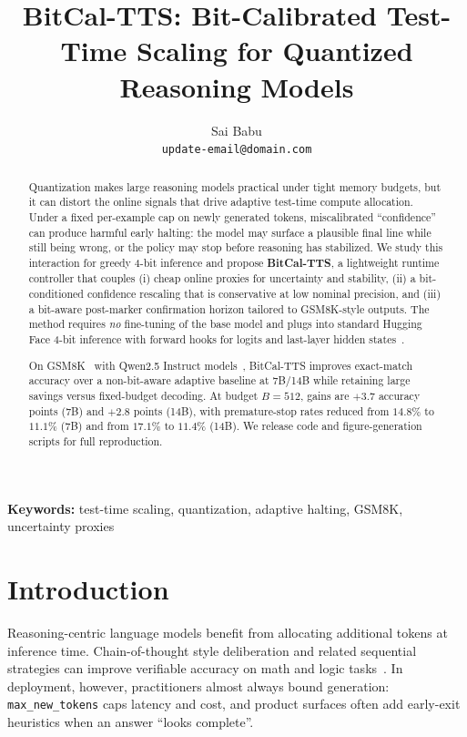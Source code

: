 \documentclass[11pt]{article}
\title{BitCal-TTS: Bit-Calibrated Test-Time Scaling for Quantized Reasoning Models}
\author{
  Sai Babu\\
  \texttt{update-email@domain.com}
}
\date{}
\begin{document}
\maketitle

\begin{abstract}
Quantization makes large reasoning models practical under tight memory budgets, but it can distort the online signals that drive adaptive test-time compute allocation. Under a fixed per-example cap on newly generated tokens, miscalibrated ``confidence'' can produce harmful early halting: the model may surface a plausible final line while still being wrong, or the policy may stop before reasoning has stabilized. We study this interaction for greedy 4-bit inference and propose \textbf{BitCal-TTS}, a lightweight runtime controller that couples (i) cheap online proxies for uncertainty and stability, (ii) a bit-conditioned confidence rescaling that is conservative at low nominal precision, and (iii) a bit-aware post-marker confirmation horizon tailored to GSM8K-style outputs. The method requires \emph{no} fine-tuning of the base model and plugs into standard Hugging Face 4-bit inference with forward hooks for logits and last-layer hidden states~\cite{transformers}.

On GSM8K~\cite{cobbe2021gsm8k} with Qwen2.5 Instruct models~\cite{qwen25technical}, BitCal-TTS improves exact-match accuracy over a non-bit-aware adaptive baseline at 7B/14B while retaining large savings versus fixed-budget decoding. At budget $B{=}512$, gains are $+3.7$ accuracy points (7B) and $+2.8$ points (14B), with premature-stop rates reduced from $14.8\%$ to $11.1\%$ (7B) and from $17.1\%$ to $11.4\%$ (14B). We release code and figure-generation scripts for full reproduction.
\end{abstract}

\noindent\textbf{Keywords:} test-time scaling, quantization, adaptive halting, GSM8K, uncertainty proxies

\section{Introduction}
Reasoning-centric language models benefit from allocating additional tokens at inference time. Chain-of-thought style deliberation and related sequential strategies can improve verifiable accuracy on math and logic tasks~\cite{wei2022cot,snell2024scalingllmtesttime,muennighoff2025s1}. In deployment, however, practitioners almost always bound generation: \texttt{max\_new\_tokens} caps latency and cost, and product surfaces often add early-exit heuristics when an answer ``looks complete''.
\end{document}
